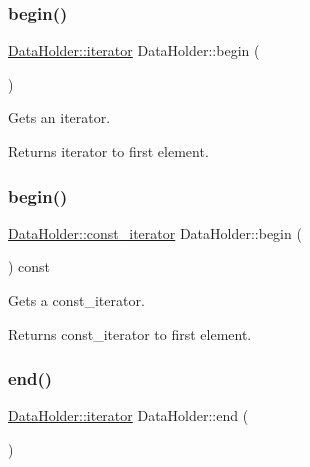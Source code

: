 \subsubsection{\texorpdfstring{begin()}{begin()}\hspace{0.1cm}{\footnotesize\ttfamily [1/2]}}
{\footnotesize\ttfamily \hyperlink{classDataHolder_adecdb7b6c101d8ce9815c2ee2a4596b2}{Data\+Holder\+::iterator} Data\+Holder\+::begin (\begin{DoxyParamCaption}{ }\end{DoxyParamCaption})}

Gets an iterator. \begin{DoxyReturn}{Returns}
iterator to first element. 
\end{DoxyReturn}
\mbox{\label{classDataHolder_a05afb99b3d1ea784b415bae839e1c4c5}} 
\subsubsection{\texorpdfstring{begin()}{begin()}\hspace{0.1cm}{\footnotesize\ttfamily [2/2]}}
{\footnotesize\ttfamily \hyperlink{classDataHolder_a6284772630d15867fe5549a2903944cd}{Data\+Holder\+::const\+\_\+iterator} Data\+Holder\+::begin (\begin{DoxyParamCaption}{ }\end{DoxyParamCaption}) const}

Gets a const\+\_\+iterator. \begin{DoxyReturn}{Returns}
const\+\_\+iterator to first element. 
\end{DoxyReturn}
\mbox{\label{classDataHolder_a082001b8e93cf0aa1500677e4156b618}} 
\subsubsection{\texorpdfstring{end()}{end()}\hspace{0.1cm}{\footnotesize\ttfamily [1/2]}}
{\footnotesize\ttfamily \hyperlink{classDataHolder_adecdb7b6c101d8ce9815c2ee2a4596b2}{Data\+Holder\+::iterator} Data\+Holder\+::end (\begin{DoxyParamCaption}{ }\end{DoxyParamCaption})}

